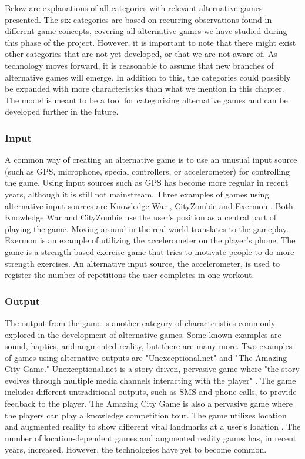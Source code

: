 Below are explanations of all categories with relevant alternative games presented. The six categories are based on recurring observations found in different game concepts, covering all alternative games we have studied during this phase of the project. However, it is important to note that there might exist other categories that are not yet developed, or that we are not aware of. As technology moves forward, it is reasonable to assume that new branches of alternative games will emerge. In addition to this, the categories could possibly be expanded with more characteristics than what we mention in this chapter. The model is meant to be a tool for categorizing alternative games and can be developed further in the future.

\subsubsection{Input}
A common way of creating an alternative game is to use an unusual input source (such as GPS, microphone, special controllers, or accelerometer) for controlling the game. Using input sources such as GPS has become more regular in recent years, although it is still not mainstream. Three examples of games using alternative input sources are Knowledge War \citep{wang_knowledge_2016}, CityZombie \citep{zhu_experiences_2010} and Exermon \citep{wang_evaluation_2017}. Both Knowledge War and CityZombie use the user’s position as a central part of playing the game. Moving around in the real world translates to the gameplay. Exermon is an example of utilizing the accelerometer on the player's phone. The game is a strength-based exercise game that tries to motivate people to do more strength exercises. An alternative input source, the accelerometer, is used to register the number of repetitions the user completes in one workout. 

\subsubsection{Output}
The output from the game is another category of characteristics commonly explored in the development of alternative games. Some known examples are sound, haptics, and augmented reality, but there are many more. Two examples of games using alternative outputs are "Unexceptional.net" and "The Amazing City Game." Unexceptional.net is a story-driven, pervasive game where "the story evolves through multiple media channels interacting with the player" \citep{wang_unexceptionalnet_2009}. The game includes different untraditional outputs, such as SMS and phone calls, to provide feedback to the player. The Amazing City Game is also a pervasive game where the players can play a knowledge competition tour. The game utilizes location and augmented reality to show different vital landmarks at a user’s location \citep{wang_pervasive_2011}. The number of location-dependent games and augmented reality games has, in recent years, increased. However, the technologies have yet to become common. 

